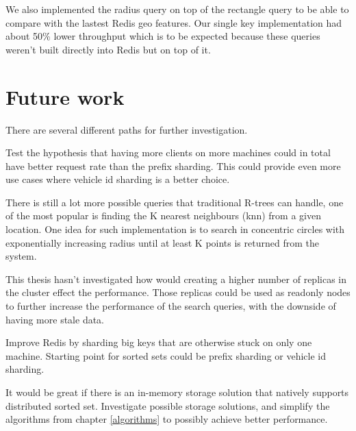 \documentclass[times, utf8, diplomski]{fer}
\begin{document}
We also implemented the radius query on top of the rectangle query to be able to compare with the lastest Redis geo features. Our single key implementation had about 50\% lower throughput which is to be expected because these queries weren't built directly into Redis but on top of it.

\section {Future work}
There are several different paths for further investigation.

Test the hypothesis that having more clients on more machines could in total have better request rate than the prefix sharding. This could provide even more use cases where vehicle id sharding is a better choice.

There is still a lot more possible queries that traditional R-trees can handle, one of the most popular is finding the K nearest neighbours (knn) from a given location. One idea for such implementation is to search in concentric circles with exponentially increasing radius until at least K points is returned from the system.

This thesis hasn't investigated how would creating a higher number of replicas in the cluster effect the performance. Those replicas could be used as readonly nodes to further increase the performance of the search queries, with the downside of having more stale data.

Improve Redis by sharding big keys that are otherwise stuck on only one machine. Starting point for sorted sets could be prefix sharding or vehicle id sharding.

It would be great if there is an in-memory storage solution that natively supports distributed sorted set. Investigate possible storage solutions, and simplify the algorithms from chapter \ref{algorithms} to possibly achieve better performance.




\end{document}
